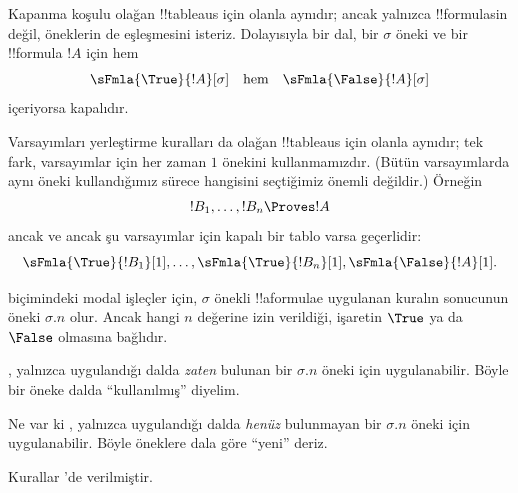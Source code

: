 Kapanma koşulu olağan !!{tableau}s için olanla aynıdır; ancak yalnızca
!!{formula}s{}in değil, öneklerin de eşleşmesini isteriz. Dolayısıyla bir dal,
bir $\sigma$ öneki ve bir !!{formula} $!A$ için hem
\[
\sFmla{\True}{!A}[\sigma] \quad\text{hem}\quad \sFmla{\False}{!A}[\sigma]
\]
içeriyorsa kapalıdır.

Varsayımları yerleştirme kuralları da olağan !!{tableau}s için olanla aynıdır;
tek fark, varsayımlar için her zaman $1$ önekini kullanmamızdır. (Bütün
varsayımlarda aynı öneki kullandığımız sürece hangisini seçtiğimiz önemli
değildir.) Örneğin
\[
!B_1, \dots, !B_n \Proves !A
\]
ancak ve ancak şu varsayımlar için kapalı bir tablo varsa geçerlidir:
\[
\sFmla{\True}{!B_1}[1], \dots, \sFmla{\True}{!B_n}[1],
\sFmla{\False}{!A}[1].
\]

 biçimindeki modal işleçler için,
$\sigma$ önekli !!a{formula}{}e uygulanan kuralın sonucunun öneki $\sigma.n$
olur. Ancak hangi $n$ değerine izin verildiği, işaretin $\True$ ya da
$\False$ olmasına bağlıdır.

, yalnızca uygulandığı
dalda \emph{zaten} bulunan bir $\sigma.n$ öneki için uygulanabilir. Böyle bir
öneke dalda ``kullanılmış'' diyelim.

Ne var ki , yalnızca
uygulandığı dalda \emph{henüz} bulunmayan bir $\sigma.n$ öneki için
uygulanabilir. Böyle öneklere dala göre ``yeni'' deriz.

Kurallar 'de verilmiştir.

